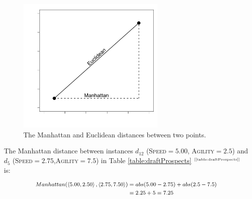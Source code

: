 \documentclass[xcolor={table}]{beamer}
\newcommand{\featN}[1]{\textsc{#1}}
\newcommand{\ourRef}[1]{\ref{#1} $^{\text{\tiny[\pageref{#1}]}}$}
\begin{document}
 \begin{frame} 
\begin{figure}[htb]
       \begin{centering}
       \includegraphics[width=0.65\textwidth]{images/manhattan_euclidean_1.pdf}
       \caption{The Manhattan and Euclidean distances between two points.}
       \label{fig:maneuc}
       \end{centering}
\end{figure}
\end{frame} 


 \begin{frame} 
 \begin{example} 
The Manhattan distance between instances $d_{12}$ (\featN{Speed}$= 5.00$, \featN{Agility}$=2.5$) and $d_5$ (\featN{Speed}$=2.75$,\featN{Agility}$=7.5$) in Table \ourRef{table:draftProspects} is:

\begin{overprint}
\begin{equation*}
\footnotesize
	\begin{alignedat}{2}
Manhattan(\left<5.00,2.50\right>,\left<2.75,7.50\right>) &= abs( 5.00 - 2.75) + abs( 2.5 - 7.5)\\
& = 2.25 + 5= 7.25
	\end{alignedat}
\label{eq:manhattanexample}
\end{equation*}
\end{overprint}

\end{example} 
\end{frame} 
\end{document}
